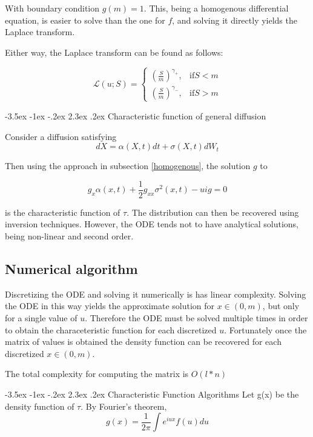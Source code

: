 \documentclass[12pt]{article}
\makeatletter
\renewcommand\section{\@startsection{section}{1}{\z@}%
                                  {-3.5ex \@plus -1ex \@minus -.2ex}%
                                  {2.3ex \@plus.2ex}%
                                  {\normalfont\large\bfseries}}
\makeatother
\begin{document}
With boundary condition \(g(m)=1\).  This, being a homogenous differential equation, is easier to solve than the one for \(f\), and solving it directly yields the Laplace transform.  

Either way, the Laplace transform can be found as follows:

\begin{equation}
\mathcal{L}(u; S)=\left\{
\begin{array}{rl}
\left(\frac{S}{m} \right) ^ {\gamma_{+}} , & \mathrm{if}  S<m \\
\left(\frac{S}{m} \right) ^ {\gamma_{-}}, & \mathrm{if} S>m
\end{array}
\right.
\end{equation}

\section{Characteristic function of general diffusion}

Consider a diffusion satisfying
\[dX=\alpha(X, t)dt+\sigma(X, t)dW_t\]

Then using the approach in subsection \ref{homogenous}, the solution \(g\) to 

\[g_x \alpha(x, t)+ \frac{1}{2}g_{xx} \sigma^2(x, t)- uig=0\]

is the characteristic function of \(\tau\).  The distribution can then be recovered using inversion techniques.  However, the ODE tends not to have analytical solutions, being non-linear and second order.  

\subsection{Numerical algorithm}

Discretizing the ODE and solving it numerically is has linear complexity.  Solving the ODE in this way yields the approximate solution for \(x \in (0, m)\), but only for a single value of \(u\).  Therefore the ODE must be solved multiple times in order to obtain the characeteristic function for each discretized \(u\).  Fortunately once the matrix of values is obtained the density function can be recovered for each discretized \(x \in (0, m)\).

The total complexity for computing the matrix is \(O(l*n)\)


\section{Characteristic Function Algorithms}
Let g(x) be the density function of \(\tau\).  By Fourier's theorem, 
\[g(x)=\frac{1}{2\pi} \int e^{iux} f(u) du \]
\end{document}
